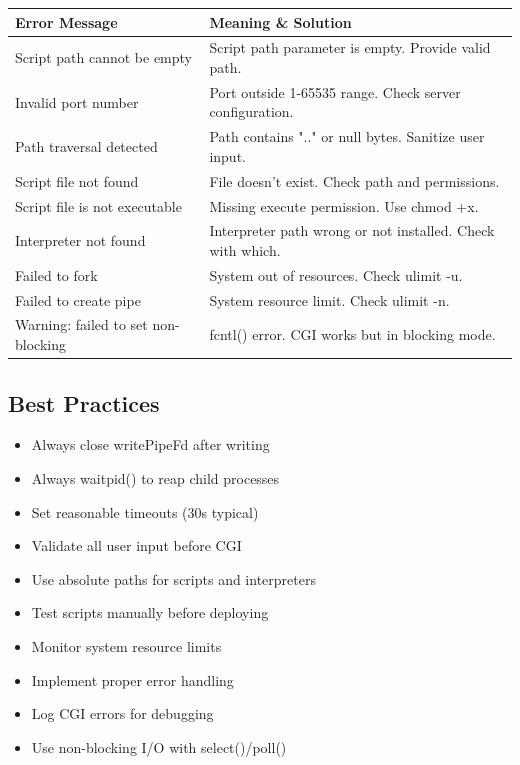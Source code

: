 \documentclass[11pt,a4paper]{article}
\begin{document}
\begin{tabular}{|p{6cm}|p{8cm}|}
\hline
\textbf{Error Message} & \textbf{Meaning \& Solution} \\
\hline
Script path cannot be empty &
Script path parameter is empty. Provide valid path. \\
\hline
Invalid port number &
Port outside 1-65535 range. Check server configuration. \\
\hline
Path traversal detected &
Path contains ".." or null bytes. Sanitize user input. \\
\hline
Script file not found &
File doesn't exist. Check path and permissions. \\
\hline
Script file is not executable &
Missing execute permission. Use chmod +x. \\
\hline
Interpreter not found &
Interpreter path wrong or not installed. Check with which. \\
\hline
Failed to fork &
System out of resources. Check ulimit -u. \\
\hline
Failed to create pipe &
System resource limit. Check ulimit -n. \\
\hline
Warning: failed to set non-blocking &
fcntl() error. CGI works but in blocking mode. \\
\hline
\end{tabular}

\subsection{Best Practices}

\begin{itemize}
    \item Always close writePipeFd after writing
    \item Always waitpid() to reap child processes
    \item Set reasonable timeouts (30s typical)
    \item Validate all user input before CGI
    \item Use absolute paths for scripts and interpreters
    \item Test scripts manually before deploying
    \item Monitor system resource limits
    \item Implement proper error handling
    \item Log CGI errors for debugging
    \item Use non-blocking I/O with select()/poll()
\end{itemize}
\end{document}
